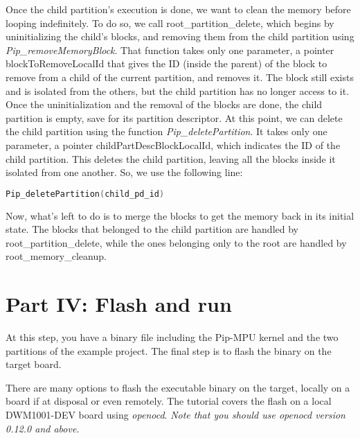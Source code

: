 \documentclass[10pt,a4paper,titlepage]{refart}
\begin{document}
Once the child partition's execution is done, we want to clean the memory before looping indefinitely. To do so, we call 
root\_partition\_delete, which begins by uninitializing the child's blocks, and removing them from the child partition using 
\textit{Pip\_removeMemoryBlock}. That function takes only one parameter, a pointer blockToRemoveLocalId that gives the ID (inside 
the parent) of the block to remove from a child of the current partition, and removes it. The block still exists and is isolated 
from the others, but the child partition has no longer access to it. Once the uninitialization and the removal of the blocks are 
done, the child partition is empty, save for its partition descriptor. At this point, we can delete the child partition using the 
function \textit{Pip\_deletePartition}. It takes only one parameter, a pointer childPartDescBlockLocalId, which indicates the ID 
of the child partition. This deletes the child partition, leaving all the blocks inside it isolated from one another. So, we use 
the following line:
\begin{lstlisting}[language=C]
Pip_deletePartition(child_pd_id)
\end{lstlisting}

Now, what's left to do is to merge the blocks to get the memory back in its initial state. The blocks that belonged to the child 
partition are handled by root\_partition\_delete, while the ones belonging only to the root are handled by root\_memory\_cleanup.




\section{Part IV: Flash and run} \label{fourth}
At this step, you have a binary file including the Pip-MPU kernel and the two partitions of the example project.
The final step is to flash the binary on the target board.

There are many options to flash the executable binary on the target, locally on a board if at disposal or even remotely.
The tutorial covers the flash on a local DWM1001-DEV board using \textit{openocd}.
\textit{Note that you should use openocd version 0.12.0 and above.}
\end{document}

